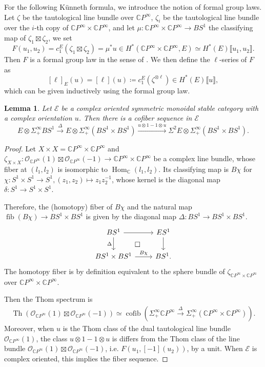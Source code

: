 \documentclass[11pt]{amsart}
\numberwithin{equation}{section}
\theoremstyle{plain}
\newtheorem{Lemma}[lemma]{Lemma}
\theoremstyle{definition}
\theoremstyle{remark}
\newcommand{\bC} { {\mathbb{C}}}
\newcommand{\cE} { {\mathcal{E}}}
\newcommand{\cO} { {\mathcal{O}}}
\newcommand{\fpw}[1]{{\llbracket #1\rrbracket}}
\newcommand{\Thom}{\operatorname{Th}}
\newcommand\Hom{\operatorname{Hom}}
\newcommand\fib{\operatorname{fib}}
\begin{document}
For the following Künneth formula, we introduce the notion of formal group laws. Let $\zeta$ be the tautological line bundle over $\bC P^\infty$, $\zeta_i$ be the tautological line bundle over the $i$-th copy of $\bC P^\infty\times \bC P^\infty$, and let $\mu:\bC P^\infty\times \bC P^\infty \to BS^1$ the classifying map of  $\zeta_1\boxtimes\zeta_2$, we set
\[F(u_1,u_2)=c_1^E(\zeta_1\boxtimes\zeta_2)=\mu^*u\in H^*(\bC P^\infty\times \bC P^\infty,E)\simeq H^*(E)\fpw{u_1,u_2}.\]
Then $F$ is a formal group law in the sense of \cite{Quillen1969FormalGroupLaws}. We then define the $\ell$-series of $F$ as
\[[\ell]_E(u)=[\ell](u)\coloneqq c_1^E(\zeta^{\otimes \ell}) \in H^*(E)\fpw{u},\]
which can be given inductively using the formal group law.

\begin{Lemma}\label{lem:Künneth}
Let $\cE$ be a complex oriented symmetric monoidal stable category with a complex orientation $u$. Then there is a cofiber sequence in $\cE$
\begin{equation}
E \otimes \Sigma^\infty_+BS^1 \xrightarrow{\Delta} E \otimes \Sigma^\infty_+(BS^1 \times BS^1) \xrightarrow{u \otimes 1 - 1 \otimes u} \Sigma^2E \otimes \Sigma^\infty_+(BS^1 \times BS^1).
\end{equation}
\end{Lemma}
\begin{proof}
Let $X \times X = \bC P^\infty \times \bC P^\infty$ and $\zeta_{X \times X}: \cO_{\bC P^\infty}(1) \boxtimes \cO_{\bC P^\infty}(-1) \to \bC P^\infty \times \bC P^\infty$ be a complex line bundle, whose fiber at $(l_1,l_2)$ is isomorphic to $\Hom_\bC(l_1,l_2)$. Its classifying map is $B\chi$ for $\chi: S^1\times S^1\to S^1, (z_1,z_2)\mapsto z_1z_2^{-1}$, whose kernel is the diagonal map $\delta:S^1\to S^1\times S^1$.




Therefore, the (homotopy) fiber of $B\chi$ and the natural map $\fib(B\chi)\to BS^1 \times BS^1$ is given by the diagonal map $\Delta: BS^1 \to BS^1 \times BS^1$. 
\[\begin{tikzcd}
BS^1 \arrow[d,"\Delta"'] \ar[dr, phantom, "\square"]\arrow[r]        & ES^1 \arrow[d] \\
BS^1 \times BS^1 \arrow[r, "B\chi"] & BS^1  .        
\end{tikzcd}\]
The homotopy fiber is by definition equivalent to the sphere bundle of $\zeta_{\bC P^\infty \times \bC P^\infty}$ over $\bC P^\infty \times \bC P^\infty$.

Then the Thom spectrum is
\begin{align}\label{eq:thom-product}
    \Thom(\cO_{\bC P^\infty}(1) \boxtimes \cO_{\bC P^\infty}(-1))  
    \simeq \operatorname{cofib}(\Sigma^\infty_+\bC P^\infty \xrightarrow{\Delta} \Sigma^\infty_+(\bC P^\infty \times \bC P^\infty)). \nonumber
\end{align}
Moreover, when $u$ is the Thom class of the dual tautological line bundle $\cO_{\bC P^\infty}(1)$, the class $u \otimes 1 - 1 \otimes u$ is differs from the Thom class of the line bundle $\cO_{\bC P^\infty}(1) \boxtimes \cO_{\bC P^\infty}(-1)$, i.e. $F(u_1,[-1](u_2))$, by a unit. When $\cE$ is complex oriented, this implies the fiber sequence.
\end{proof}
\end{document}
